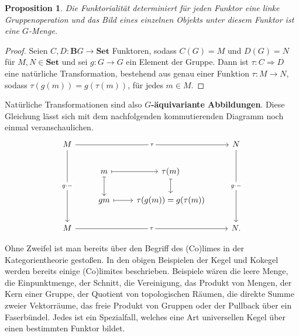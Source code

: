 \documentclass{article}
\theoremstyle{plain}
\newtheorem{prop}[thm]{Proposition}
\theoremstyle{definition}
\theoremstyle{remark}
\begin{document}
\begin{prop}
Die Funktorialität determiniert für jeden Funktor eine linke Gruppenoperation und das Bild eines einzelnen Objekts unter diesem Funktor ist eine $G$-Menge.
\end{prop}

\begin{proof}
Seien $C,D: \textbf{B}G \rightarrow \textbf{Set}$ Funktoren, sodass $C(G) = M$ und $D(G) = N$ für $M,N \in \textbf{Set}$ und sei $g: G \rightarrow G$ ein Element der Gruppe. Dann ist $\tau: C \Longrightarrow D$ eine natürliche Transformation, bestehend aus genau einer Funktion $\tau: M \rightarrow N$, sodass $\tau(g(m)) = g(\tau(m))$, für jedes $m \in M$.
\end{proof}

Natürliche Transformationen sind also \textbf{$G$-äquivariante Abbildungen}. Diese Gleichung lässt sich mit dem nachfolgenden kommutierenden Diagramm noch einmal veranschaulichen.
	\begin{equation}
		\begin{tikzcd}
		M \arrow[rrr, "\tau" description] \arrow[ddd, "g\cdot-" description] &                                         &                            & N \arrow[ddd, "g\cdot-" description] \\
		                                                                     & m \arrow[d, maps to] \arrow[r, maps to] & \tau(m) \arrow[d, maps to] &                                      \\
		                                                                     & gm \arrow[r, maps to]                   & \tau(g(m)) = g(\tau(m))    &                                      \\
		M \arrow[rrr, "\tau" description]                                    &                                         &                            & N.                                   
		\end{tikzcd}
	\end{equation}

Ohne Zweifel ist man bereits über den Begriff des (Co)limes in der Kategorientheorie gestoßen. In den obigen Beispielen der Kegel und Kokegel werden bereits einige (Co)limites beschrieben. Beispiele wären die leere Menge, die Einpunktmenge, der Schnitt, die Vereinigung, das Produkt von Mengen, der Kern einer Gruppe, der Quotient von topologischen Räumen, die direkte Summe zweier Vektorräume, das freie Produkt von Gruppen oder der Pullback über ein Faserbündel. Jedes ist ein Spezialfall, welches eine Art universellen Kegel über einen bestimmten Funktor bildet.
\end{document}
